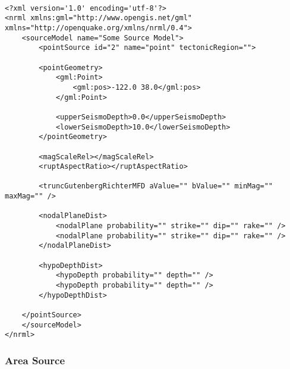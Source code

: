 \begin{Verbatim}[frame=single, commandchars=\\\{\}, fontsize=\scriptsize]

<?xml version='1.0' encoding='utf-8'?>
<nrml xmlns:gml="http://www.opengis.net/gml" xmlns="http://openquake.org/xmlns/nrml/0.4">
    <sourceModel name="Some Source Model">
        <pointSource id="2" name="point" tectonicRegion="">

        <pointGeometry>
            <gml:Point>
                <gml:pos>-122.0 38.0</gml:pos>
            </gml:Point>

            <upperSeismoDepth>0.0</upperSeismoDepth>
            <lowerSeismoDepth>10.0</lowerSeismoDepth>
        </pointGeometry>

        <magScaleRel></magScaleRel>
        <ruptAspectRatio></ruptAspectRatio>

        <truncGutenbergRichterMFD aValue="" bValue="" minMag="" maxMag="" />

        <nodalPlaneDist>
            <nodalPlane probability="" strike="" dip="" rake="" />
            <nodalPlane probability="" strike="" dip="" rake="" />
        </nodalPlaneDist>

        <hypoDepthDist>
            <hypoDepth probability="" depth="" />
            <hypoDepth probability="" depth="" />
        </hypoDepthDist>

    </pointSource>
    </sourceModel>
</nrml>

\end{Verbatim}


\subsubsection{Area Source}

